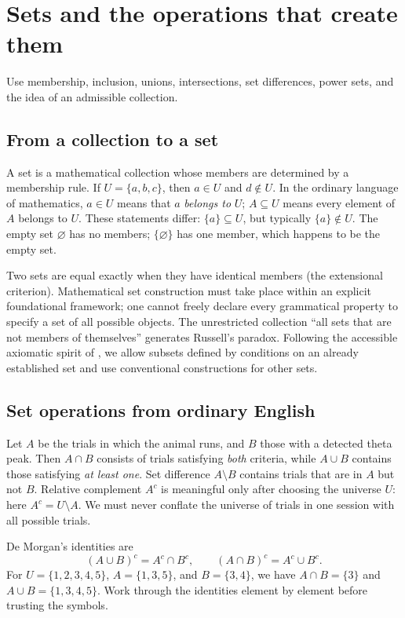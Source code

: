 \chapter{Sets and the operations that create them}\label{ch:sets}
\begin{readergoal}Use membership, inclusion, unions, intersections, set differences, power sets, and the idea of an admissible collection.\end{readergoal}
\section{From a collection to a set}
A set is a mathematical collection whose members are determined by a membership rule. If $U=\{a,b,c\}$, then $a\in U$ and $d\notin U$. In the ordinary language of mathematics, $a\in U$ means that $a$ \emph{belongs to} $U$; $A\subseteq U$ means every element of $A$ belongs to $U$. These statements differ: $\{a\}\subseteq U$, but typically $\{a\}\notin U$. The empty set $\varnothing$ has no members; $\{\varnothing\}$ has one member, which happens to be the empty set.

Two sets are equal exactly when they have identical members (the extensional criterion). Mathematical set construction must take place within an explicit foundational framework; one cannot freely declare every grammatical property to specify a set of all possible objects. The unrestricted collection ``all sets that are not members of themselves'' generates Russell's paradox. Following the accessible axiomatic spirit of \cite{HalmosNaive,MendelsonNumbers}, we allow subsets defined by conditions on an already established set and use conventional constructions for other sets.

\section{Set operations from ordinary English}
Let $A$ be the trials in which the animal runs, and $B$ those with a detected theta peak. Then $A\cap B$ consists of trials satisfying \emph{both} criteria, while $A\cup B$ contains those satisfying \emph{at least one}. Set difference $A\setminus B$ contains trials that are in $A$ but not $B$. Relative complement $A^c$ is meaningful only after choosing the universe $U$: here $A^c=U\setminus A$. We must never conflate the universe of trials in one session with all possible trials.

De Morgan's identities are
\[(A\cup B)^c=A^c\cap B^c,\qquad(A\cap B)^c=A^c\cup B^c.\]
For $U=\{1,2,3,4,5\}$, $A=\{1,3,5\}$, and $B=\{3,4\}$, we have $A\cap B=\{3\}$ and $A\cup B=\{1,3,4,5\}$. Work through the identities element by element before trusting the symbols.

